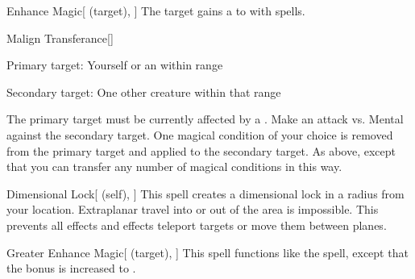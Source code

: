 \lowercase{\hypertarget{spell:Enhance Magic}{}}\label{spell:Enhance Magic}
\begin{attuneability}[\nth{2}]{\hypertarget{spell:Enhance Magic}{Enhance Magic}}[ (target), ]
The target gains a   to  with spells.
\end{attuneability}
\vspace{0.25em}



\lowercase{\hypertarget{spell:Malign Transferance}{}}\label{spell:Malign Transferance}
\begin{freeability}[\nth{2}]{\hypertarget{spell:Malign Transferance}{Malign Transferance}}[]

Primary target: Yourself or an  within \rngmed range
\par\noindent
Secondary target: One other creature within that range

The primary target must be currently affected by a  .
Make an attack vs. Mental against the secondary target.
\hit One magical condition of your choice is removed from the primary target and applied to the secondary target.
\crit As above, except that you can transfer any number of magical conditions in this way.
\end{freeability}
\vspace{0.25em}



\lowercase{\hypertarget{spell:Dimensional Lock}{}}\label{spell:Dimensional Lock}
\begin{attuneability}[\nth{4}]{\hypertarget{spell:Dimensional Lock}{Dimensional Lock}}[ (self), ]
\targetrule
This spell creates a dimensional lock in a \arealarge radius  from your location.
Extraplanar travel into or out of the area is impossible.
This prevents all  effects and effects teleport targets or move them between planes.
\end{attuneability}
\vspace{0.25em}



\lowercase{\hypertarget{spell:Greater Enhance Magic}{}}\label{spell:Greater Enhance Magic}
\begin{attuneability}[\nth{5}]{\hypertarget{spell:Greater Enhance Magic}{Greater Enhance Magic}}[ (target), ]
This spell functions like the  spell, except that the bonus is increased to .
\end{attuneability}
\vspace{0.25em}



